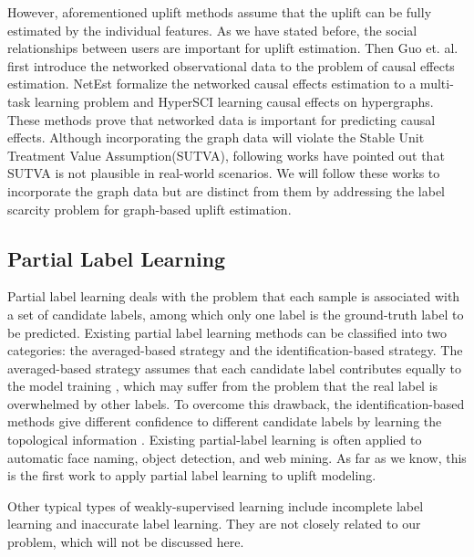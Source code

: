However, aforementioned uplift methods assume that the uplift can be fully estimated by the individual features. As we have stated before, the social relationships between users are important for uplift estimation. Then Guo et. al.\cite{guo2020learning,guo2020counterfactual,ma2021deconfounding} first introduce the networked observational data to the problem of causal effects estimation. NetEst\cite{jiang2022estimating} formalize the networked causal effects estimation to a multi-task learning problem and HyperSCI\cite{ma2022learning} learning causal effects on hypergraphs. These methods prove that networked data is important for predicting causal effects. Although incorporating the graph data will violate the Stable Unit Treatment Value Assumption(SUTVA), following works \cite{sobel2006what} have pointed out that SUTVA is not plausible in real-world scenarios. We will follow these works \cite{guo2020learning,guo2020counterfactual} to incorporate the graph data but are distinct from them by addressing the label scarcity problem for graph-based uplift estimation.  

\subsection{Partial Label Learning}
Partial label learning deals with the problem that each sample is associated with a set of candidate labels, among which only one label is the ground-truth label to be predicted. Existing partial label learning methods can be classified into two categories: the averaged-based strategy and the identification-based strategy. The averaged-based strategy assumes that each candidate label contributes equally to the model training \cite{hullermeier2006learning,gong2017regularization}, which may suffer from the problem that the real label is overwhelmed by other labels. To overcome this drawback, the identification-based methods give different confidence to different candidate labels by learning the topological information \cite{zhang2015solving,zhang2016partial}. Existing partial-label learning is often applied to automatic face naming, object detection, and web mining. As far as we know, this is the first work to apply partial label learning to uplift modeling.

Other typical types of weakly-supervised learning  include incomplete label learning\cite{zhao2015semi-supervised} and inaccurate label learning\cite{wu2018a}. They are not closely related to our problem, which will not be discussed here. 

